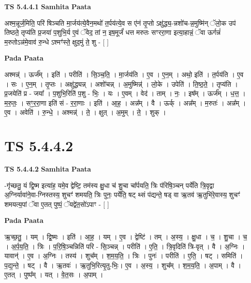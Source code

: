 \documentclass[17pt]{extarticle}
\begin{document}
\textbf{TS 5.4.4.1 } \newline
\textbf{Samhita Paata} \newline

अश्म॒न्नूर्ज॒मिति॒ परि॑ षिञ्चति मा॒र्जय॑त्ये॒वैन॒मथो॑ त॒र्पय॑त्ये॒व स ए॑नं तृ॒प्तो ऽक्षु॑द्ध्य॒-न्नशो॑च-न्न॒मुष्मि॑न् ॅलो॒क उप॑ तिष्ठते॒ तृप्य॑ति प्र॒जया॑ प॒शुभि॒र्य ए॒वं ॅवेद॒ तां न॒ इष॒मूर्जं॑ धत्त मरुतः सꣳररा॒णा इत्या॒हान्नं॒ ॅवा ऊर्गन्नं॑ म॒रुतोऽन्न॑मे॒वाव॑ रु॒न्धे ऽश्मꣳ॑स्ते॒ क्षुद॒मुं ते॒ शु - [  ] \newline

\textbf{Pada Paata} \newline

अश्मन्न्॑ । ऊर्ज᳚म् । इति॑ । परीति॑ । सि॒ञ्च॒ति॒ । मा॒र्जय॑ति । ए॒व । ए॒न॒म् । अथो॒ इति॑ । त॒र्पय॑ति । ए॒व । सः । ए॒न॒म् । तृ॒प्तः । अक्षु॑द्ध्यन्न् । अशो॑चन्न् । अ॒मुष्मिन्न्॑ । लो॒के । उपेति॑ । ति॒ष्ठ॒ते॒ । तृप्य॑ति । प्र॒जयेति॑ प्र - जया᳚ । प॒शुभि॒रिति॑ प॒शु - भिः॒ । यः । ए॒वम् । वेद॑ । ताम् । नः॒ । इष᳚म् । ऊर्ज᳚म् । ध॒त्त॒ । म॒रु॒तः॒ । सꣳ॒॒र॒रा॒णा इति॑ सं - र॒रा॒णाः । इति॑ । आ॒ह॒ । अन्न᳚म् । वै । ऊर्क् । अन्न᳚म् । म॒रुतः॑ । अन्न᳚म् । ए॒व । अवेति॑ । रु॒न्धे॒ । अश्मन्न्॑ । ते॒ । क्षुत् । अ॒मुम् । ते॒ । शुक् ।  \newline





\section{ TS 5.4.4.2 }

\textbf{TS 5.4.4.2 } \newline
\textbf{Samhita Paata} \newline

-गृ॑च्छतु॒ यं द्वि॒ष्म इत्या॑ह॒ यमे॒व द्वेष्टि॒ तम॑स्य क्षु॒धा च॑ शु॒चा चा᳚र्पयति॒ त्रिः प॑रिषि॒ञ्चन् पर्ये॑ति त्रि॒वृद्वा अ॒ग्निर्यावा॑ने॒वा-ग्निस्तस्य॒ शुचꣳ॑ शमयति॒ त्रिः पुनः॒ पर्ये॑ति॒ षट् थ्सं प॑द्यन्ते॒ षड् वा ऋ॒तव॑ ऋ॒तुभि॑रे॒वास्य॒ शुचꣳ॑ शमयत्य॒पां ॅवा ए॒तत् पुष्पं॒ ॅयद्वे॑त॒सो॑ऽपाꣳ - [  ] \newline

\textbf{Pada Paata} \newline

ऋ॒च्छ॒तु॒ । यम् । द्वि॒ष्मः । इति॑ । आ॒ह॒ । यम् । ए॒व । द्वेष्टि॑ । तम् । अ॒स्य॒ । क्षु॒धा । च॒ । शु॒चा । च॒ । अ॒र्प॒य॒ति॒ । त्रिः । प॒रि॒षि॒ञ्चन्निति॑ परि - सि॒ञ्चन्न् । परीति॑ । ए॒ति॒ । त्रि॒वृदिति॑ त्रि-वृत् । वै । अ॒ग्निः । यावान्॑ । ए॒व । अ॒ग्निः । तस्य॑ । शुच᳚म् । श॒म॒य॒ति॒ । त्रिः । पुनः॑ । परीति॑ । ए॒ति॒ । षट् । समिति॑ । प॒द्य॒न्ते॒ । षट् । वै । ऋ॒तवः॑ । ऋ॒तुभि॒रित्यृ॒तु-भिः॒। ए॒व । अ॒स्य॒ । शुच᳚म् । श॒म॒य॒ति॒ । अ॒पाम् । वै । ए॒तत् । पुष्प᳚म् । यत् । वे॒त॒सः । अ॒पाम् ।  \newline
\end{document}
